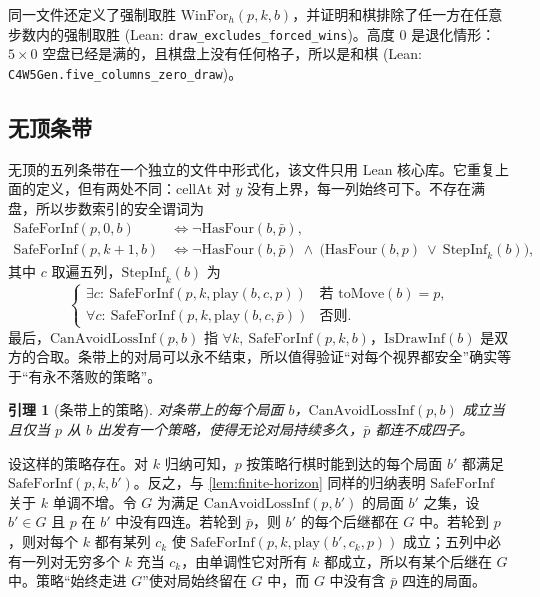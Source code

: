 \documentclass[11pt,a4paper]{article}
\makeatletter
\theoremstyle{zhthm}
\newtheorem{lemma}[theorem]{引理}
\renewcommand{\proofname}{证明}
\renewenvironment{proof}[1][\proofname]{\par\pushQED{\qed}\normalfont
  \topsep6\p@\@plus6\p@\relax\trivlist\item[\hskip\labelsep\bfseries #1]\hspace{1em}\ignorespaces}
  {\popQED\endtrivlist\@endpefalse}
\newcommand{\code}[1]{{\upshape\texttt{\small\nolinkurl{#1}}}}
\newcommand{\leanref}[1]{(Lean: \code{#1})}
\newcommand{\HasFour}{\mathrm{HasFour}}
\makeatother
\begin{document}
同一文件还定义了强制取胜 $\mathrm{WinFor}_h(p,k,b)$，并证明和棋排除了任一方在任意步数内的强制取胜 \leanref{draw_excludes_forced_wins}。高度 $0$ 是退化情形：$5\times 0$ 空盘已经是满的，且棋盘上没有任何格子，所以是和棋 \leanref{C4W5Gen.five_columns_zero_draw}。

\subsection{无顶条带}
\label{sec:strip-def}

无顶的五列条带在一个独立的文件中形式化，该文件只用 Lean 核心库。它重复上面的定义，但有两处不同：$\mathrm{cellAt}$ 对 $y$ 没有上界，每一列始终可下。不存在满盘，所以步数索引的安全谓词为
\begin{align*}
  \mathrm{SafeForInf}(p,0,b) &\iff \neg\HasFour(b,\bar p),\\
  \mathrm{SafeForInf}(p,k{+}1,b) &\iff \neg\HasFour(b,\bar p)\ \wedge\ \bigl(\HasFour(b,p)\ \vee\ \mathrm{StepInf}_k(b)\bigr),
\end{align*}
其中 $c$ 取遍五列，$\mathrm{StepInf}_k(b)$ 为
\[
  \begin{cases}
    \exists c:\ \mathrm{SafeForInf}(p,k,\mathrm{play}(b,c,p)) & \text{若 } \mathrm{toMove}(b)=p,\\
    \forall c:\ \mathrm{SafeForInf}(p,k,\mathrm{play}(b,c,\bar p)) & \text{否则}.
  \end{cases}
\]
最后，$\mathrm{CanAvoidLossInf}(p,b)$ 指 $\forall k,\ \mathrm{SafeForInf}(p,k,b)$，$\mathrm{IsDrawInf}(b)$ 是双方的合取。条带上的对局可以永不结束，所以值得验证“对每个视界都安全”确实等于“有永不落败的策略”。

\begin{lemma}[条带上的策略]
\label{lem:koenig}
对条带上的每个局面 $b$，$\mathrm{CanAvoidLossInf}(p,b)$ 成立当且仅当 $p$ 从 $b$ 出发有一个策略，使得无论对局持续多久，$\bar p$ 都连不成四子。
\end{lemma}

\begin{proof}
设这样的策略存在。对 $k$ 归纳可知，$p$ 按策略行棋时能到达的每个局面 $b'$ 都满足 $\mathrm{SafeForInf}(p,k,b')$。反之，与 \cref{lem:finite-horizon} 同样的归纳表明 $\mathrm{SafeForInf}$ 关于 $k$ 单调不增。令 $G$ 为满足 $\mathrm{CanAvoidLossInf}(p,b')$ 的局面 $b'$ 之集，设 $b'\in G$ 且 $p$ 在 $b'$ 中没有四连。若轮到 $\bar p$，则 $b'$ 的每个后继都在 $G$ 中。若轮到 $p$，则对每个 $k$ 都有某列 $c_k$ 使 $\mathrm{SafeForInf}(p,k,\mathrm{play}(b',c_k,p))$ 成立；五列中必有一列对无穷多个 $k$ 充当 $c_k$，由单调性它对所有 $k$ 都成立，所以有某个后继在 $G$ 中。策略“始终走进 $G$”使对局始终留在 $G$ 中，而 $G$ 中没有含 $\bar p$ 四连的局面。
\end{proof}
\end{document}
